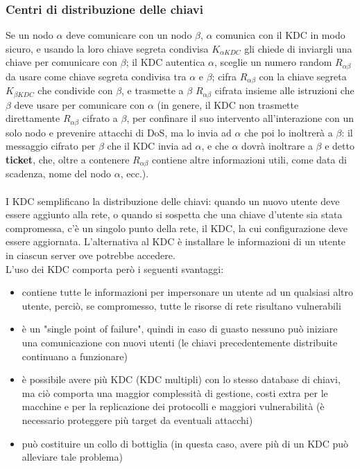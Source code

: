 \subsubsection{Centri di distribuzione delle chiavi}
Se un nodo $\alpha$ deve comunicare con un nodo $\beta$, $\alpha$ comunica con il KDC in modo sicuro, e usando la loro chiave segreta condivisa $K_{\alpha KDC}$ gli chiede di inviargli una chiave per comunicare con $\beta$; il KDC autentica $\alpha$, sceglie un numero random $R_{\alpha\beta}$ da usare come chiave segreta condivisa tra $\alpha$ e $\beta$; cifra $R_{\alpha\beta}$ con la chiave segreta $K_{\beta KDC}$ che condivide con $\beta$, e trasmette a $\beta$ $R_{\alpha\beta} $ cifrata insieme alle istruzioni che $\beta$ deve usare per comunicare con $\alpha$ (in genere, il KDC non trasmette direttamente $ R_{\alpha\beta} $ cifrato a $\beta$, per confinare il suo intervento all'interazione con un solo nodo e prevenire attacchi di DoS, ma lo invia ad $\alpha$ che poi lo inoltrerà a $\beta$:
il messaggio cifrato per $\beta$ che il KDC invia ad $\alpha$, e che $\alpha$ dovrà inoltrare a $\beta$ e detto \textbf{ticket}, che, oltre a contenere $ R_{\alpha\beta} $ contiene altre informazioni utili, come data di scadenza, nome del nodo $\alpha$, ecc.). \\ \\
I KDC semplificano la distribuzione delle chiavi: quando un nuovo utente deve essere aggiunto alla rete, o quando si sospetta che una chiave d’utente sia stata compromessa, c’è un singolo punto della rete, il KDC, la cui configurazione deve essere aggiornata. L’alternativa al KDC è installare le informazioni di un utente in ciascun server ove potrebbe accedere. \\
L'uso dei KDC comporta però i seguenti svantaggi: 
\begin{itemize}
\item contiene tutte le informazioni per impersonare un utente ad un qualsiasi altro utente, perciò, se compromesso, tutte le risorse di rete risultano vulnerabili
\item è un "single point of failure", quindi in caso di guasto nessuno può iniziare una comunicazione con nuovi utenti (le chiavi precedentemente distribuite continuano a funzionare)
\item è possibile avere più KDC (KDC multipli) con lo stesso database di chiavi, ma ciò comporta una maggior complessità di gestione, costi extra per le macchine e per la replicazione dei protocolli e maggiori vulnerabilità (è necessario proteggere più target da eventuali attacchi)
\item può costituire un collo di bottiglia (in questa caso, avere più di un KDC può alleviare tale problema)
\end{itemize}  

